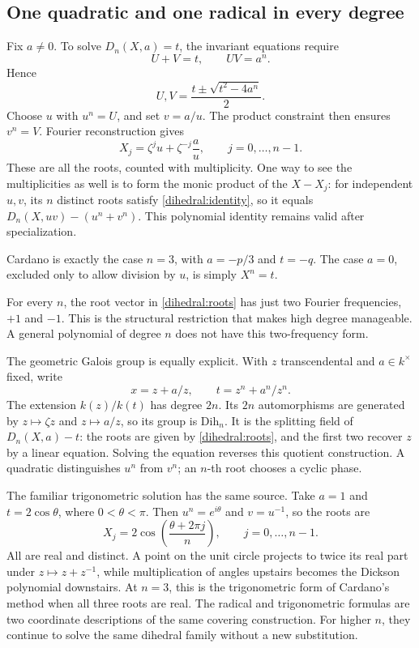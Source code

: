 \documentclass[11pt]{article}
\theoremstyle{remark}
\begin{document}
\subsection{One quadratic and one radical in every degree}

Fix \(a\ne0\). To solve \(D_n(X,a)=t\), the invariant equations require
\[
U+V=t,\qquad UV=a^n.
\]
Hence
\[
U,V=\frac{t\pm\sqrt{t^2-4a^n}}2.
\]
Choose \(u\) with \(u^n=U\), and set \(v=a/u\). The product constraint then ensures \(v^n=V\). Fourier reconstruction gives
\begin{equation}
X_j=\zeta^j u+\zeta^{-j}\frac a u,
\qquad j=0,\ldots,n-1.
\label{dihedral:roots}
\end{equation}
These are all the roots, counted with multiplicity. One way to see the multiplicities as well is to form the monic product of the \(X-X_j\): for independent \(u,v\), its \(n\) distinct roots satisfy \eqref{dihedral:identity}, so it equals \(D_n(X,uv)-(u^n+v^n)\). This polynomial identity remains valid after specialization.

Cardano is exactly the case \(n=3\), with \(a=-p/3\) and \(t=-q\). The case \(a=0\), excluded only to allow division by \(u\), is simply \(X^n=t\).

For every \(n\), the root vector in \eqref{dihedral:roots} has just two Fourier frequencies, \(+1\) and \(-1\). This is the structural restriction that makes high degree manageable. A general polynomial of degree \(n\) does not have this two-frequency form.

The geometric Galois group is equally explicit. With \(z\) transcendental and \(a\in k^\times\) fixed, write
\[
x=z+a/z,\qquad t=z^n+a^n/z^n.
\]
The extension \(k(z)/k(t)\) has degree \(2n\). Its \(2n\) automorphisms are generated by \(z\mapsto\zeta z\) and \(z\mapsto a/z\), so its group is \(\mathrm{Dih}_n\). It is the splitting field of \(D_n(X,a)-t\): the roots are given by \eqref{dihedral:roots}, and the first two recover \(z\) by a linear equation. Solving the equation reverses this quotient construction. A quadratic distinguishes \(u^n\) from \(v^n\); an \(n\)-th root chooses a cyclic phase.

The familiar trigonometric solution has the same source. Take \(a=1\) and \(t=2\cos\theta\), where \(0<\theta<\pi\). Then \(u^n=e^{i\theta}\) and \(v=u^{-1}\), so the roots are
\[
X_j=2\cos\!\left(\frac{\theta+2\pi j}{n}\right),
\qquad j=0,\ldots,n-1.
\]
All are real and distinct. A point on the unit circle projects to twice its real part under \(z\mapsto z+z^{-1}\), while multiplication of angles upstairs becomes the Dickson polynomial downstairs. At \(n=3\), this is the trigonometric form of Cardano's method when all three roots are real. The radical and trigonometric formulas are two coordinate descriptions of the same covering construction. For higher \(n\), they continue to solve the same dihedral family without a new substitution.
\end{document}
